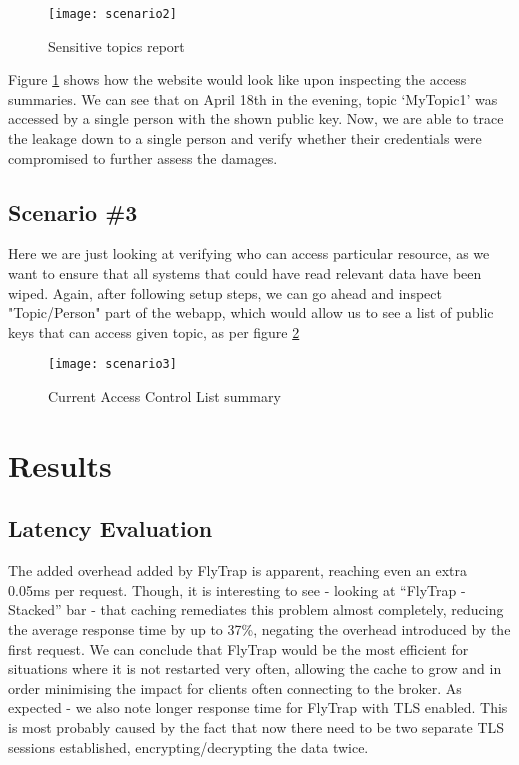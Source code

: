 \begin{figure}[h]
    \centering
    \texttt{[image: scenario2]}
    \caption{Sensitive topics report}
    \label{fig:scenario2}
\end{figure}
Figure \ref{fig:scenario2} shows how the website would look like upon inspecting the access summaries. We can see that on April 18th in the evening, topic `MyTopic1' was accessed by a single person with the shown public key. Now, we are able to trace the leakage down to a single person and verify whether their credentials were compromised to further assess the damages.
\subsection{Scenario \#3}
Here we are just looking at verifying who can access particular resource, as we want to ensure that all systems that could have read relevant data have been wiped. Again, after following setup steps, we can go ahead and inspect "Topic/Person" part of the webapp, which would allow us to see a list of public keys that can access given topic, as per figure \ref{fig:scenario3}
\begin{figure}[h]
    \centering
    \texttt{[image: scenario3]}
    \caption{Current Access Control List summary}
    \label{fig:scenario3}
\end{figure}
\section{Results}
\subsection{Latency Evaluation}
The added overhead added by FlyTrap is apparent, reaching even an extra 0.05ms per request. Though, it is interesting to see - looking at ``FlyTrap - Stacked'' bar - that caching remediates this problem almost completely, reducing the average response time by up to 37\%, negating the overhead introduced by the first request. We can conclude that FlyTrap would be the most efficient for situations where it is not restarted very often, allowing the cache to grow and in order minimising the impact for clients often connecting to the broker. As expected - we also note longer response time for FlyTrap with TLS enabled. This is most probably caused by the fact that now there need to be two separate TLS sessions established, encrypting/decrypting the data twice. 
